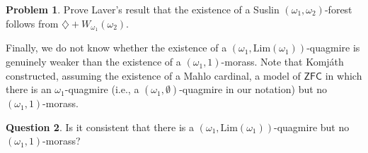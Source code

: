 \documentclass[]{amsart}
\theoremstyle{definition}
\newtheorem{question}{Question}
\newtheorem{problem}[question]{Problem}
\theoremstyle{remark}
\begin{document}
\begin{problem}
Prove Laver's result that the existence of a Suslin $(\omega_1, \omega_2)$-forest follows from $\diamondsuit + W_{\omega_1}(\omega_2)$.
\end{problem}

Finally, we do not know whether the existence of a $(\omega_1, \mathrm{Lim}(\omega_1))$-quagmire is genuinely weaker than the existence of a $(\omega_1, 1)$-morass. Note that Komj\'{a}th \cite{MR877858} constructed, assuming the existence of a Mahlo cardinal, a model of $\mathsf{ZFC}$ in which there is an $\omega_1$-quagmire (i.e., a $(\omega_1, \emptyset)$-quagmire in our notation) but no $(\omega_1, 1)$-morass. 
\begin{question}
Is it consistent that there is a $(\omega_1, \mathrm{Lim}(\omega_1))$-quagmire but no $(\omega_1, 1)$-morass?
\end{question}


\printbibliography
\end{document}
